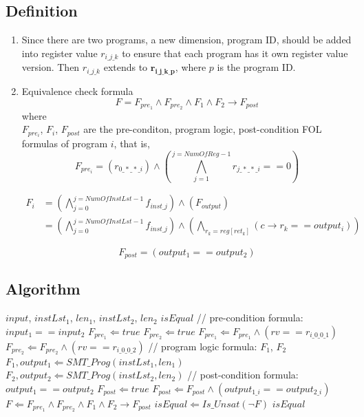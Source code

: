 \documentclass{article}
\begin{document}
\subsection{Definition}
\begin{enumerate}
\item Since there are two programs, a new dimension, program ID, should be added into register value $r_{i\_j\_k}$ to ensure that each program has it own register value version. Then $r_{i\_j\_k}$ extends to $\bm{r_{i\_j\_k\_p}}$, where $p$ is the program ID.
\item Equivalence check formula
\begin{equation}
F = F_{pre_1} \wedge F_{pre_2} \wedge F_1 \wedge F_2 \rightarrow F_{post}
\end{equation}
where \\
$F_{pre_i}$, $F_i$, $F_{post}$ are the pre-conditon, program logic, post-condition FOL formulas of program $i$, that is,
\begin{equation}
F_{pre_i} = (r_{0\_*\_*\_i})\wedge (\bigwedge_{j = 1}^{j = NumOfReg-1} r_{j\_*\_*\_i} == 0)
\end{equation}

\begin{equation}
\begin{aligned}
F_{i} &= (\bigwedge_{j=0}^{j=NumOfInstLst-1} f_{inst\_j}) \wedge (F_{output}) \\
&= (\bigwedge_{j=0}^{j=NumOfInstLst-1} f_{inst\_j}) \wedge (\bigwedge_{r_k = reg[ret_k]} (c \rightarrow r_k == output_i))
\end{aligned}
\end{equation}

\begin{equation}
F_{post} = (output_1 == output_2)
\end{equation}
\end{enumerate}

\subsection{Algorithm}
\begin{algorithm}
\begin{algorithmic}[1]
\caption{Equivalence\_Check}
\REQUIRE $input$, $instLst_1$, $len_1$, $instLst_2$, $len_2$
\ENSURE $isEqual$
\STATE // pre-condition formula: $input_1 == input_2$
\STATE $F_{pre_1} \Leftarrow true$
\STATE $F_{pre_2} \Leftarrow true$
\STATE $F_{pre_1} \Leftarrow F_{pre_1} \wedge (rv == r_{i\_0\_0\_1})$
\STATE $F_{pre_2} \Leftarrow F_{pre_2} \wedge (rv == r_{i\_0\_0\_2})$
\ENDFOR{}
\STATE // program logic formula: $F_1$, $F_2$
\STATE $F_1, output_1 \Leftarrow SMT\_Prog(instLst_1, len_1)$
\STATE $F_2, output_2 \Leftarrow SMT\_Prog(instLst_2, len_2)$
\STATE // post-condition formula: $output_1 == output_2$
\STATE $F_{post} \Leftarrow true$
\STATE $F_{post} \Leftarrow F_{post} \wedge (output_{1\_i} == output_{2\_i})$
\ENDFOR
\STATE $F \Leftarrow F_{pre_1} \wedge F_{pre_2} \wedge F_1 \wedge F_2 \rightarrow F_{post} $
\STATE $isEqual \Leftarrow Is\_Unsat(\neg F)$
\RETURN $isEqual$
\end{algorithmic}
\end{algorithm}
\end{document}
